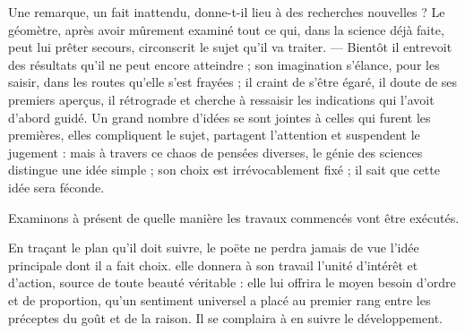 \documentclass[11pt,a4paper]{article}
\begin{document}
Une remarque, un fait inattendu, donne-t-il lieu à des recherches nouvelles ?
Le géomètre, après avoir mûrement examiné tout ce qui, dans la science déjà
faite, peut lui prêter secours, circonscrit le sujet qu'il va traiter. —
Bientôt il entrevoit des résultats qu'il ne peut encore atteindre ; son
imagination s'élance, pour les saisir, dans les routes qu'elle s'est frayées ;
il craint de s'être égaré, il doute de ses premiers aperçus, il rétrograde et
cherche à ressaisir les indications qui l'avoit d'abord guidé. Un grand nombre
d'idées se sont jointes à celles qui furent les premières, elles compliquent le
sujet, partagent l'attention et suspendent le jugement : mais à travers ce
chaos de pensées diverses, le génie des sciences distingue une idée simple ; son
choix est irrévocablement fixé ; il sait que cette idée sera féconde.


Examinons à présent de quelle manière les travaux commencés vont être exécutés.



En traçant le plan qu'il  doit suivre, le poëte ne perdra jamais de
vue l'idée principale dont il a fait choix. elle donnera à son travail l'unité
d'intérêt et d'action, source de toute beauté véritable :  elle lui
offrira le moyen    besoin d'ordre
et de proportion,  qu'un sentiment  universel a placé au premier
rang  entre les \struck{\ill{}} préceptes 
du goût et de la raison. Il se complaira à en suivre le développement.
\end{document}

